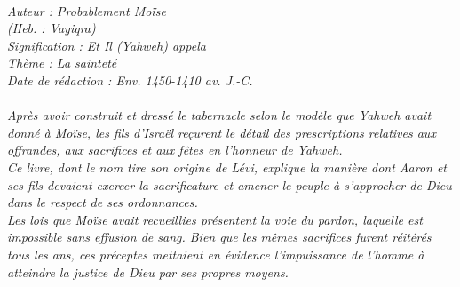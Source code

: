 \BFont
\noindent\hrulefill
{\footnotesize
\textit{
\bigskip
{\centering{}
\\Auteur : Probablement Moïse
\\(Heb. : Vayiqra)
\\Signification : Et Il (Yahweh) appela
\\Thème : La sainteté
\\Date de rédaction : Env. 1450-1410 av. J.-C.\\}
}
\textit{
\\Après avoir construit et dressé le tabernacle selon le modèle que Yahweh avait donné à Moïse, les fils d'Israël reçurent le détail des prescriptions relatives aux offrandes, aux sacrifices et aux fêtes en l'honneur de Yahweh. 
\\Ce livre, dont le nom tire son origine de Lévi, explique la manière dont Aaron et ses fils devaient exercer la sacrificature et amener le peuple à s'approcher de Dieu dans le respect de ses ordonnances.
\\Les lois que Moïse avait recueillies présentent la voie du pardon, laquelle est impossible sans effusion de sang. Bien que les mêmes sacrifices furent réitérés tous les ans, ces préceptes mettaient en évidence l'impuissance de l'homme à atteindre la justice de Dieu par ses propres moyens.\bigskip
}
}
\par\nobreak\noindent\hrulefill
